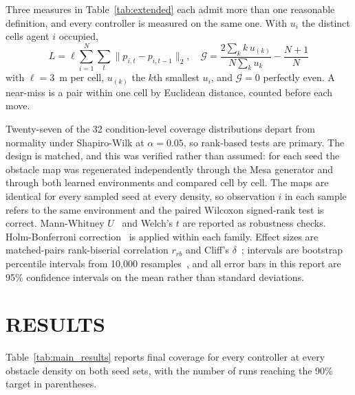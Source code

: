 \documentclass[a4paper, 10pt, conference]{ieeeconf}
\begin{document}
Three measures in Table~\ref{tab:extended} each admit more than one
reasonable definition, and every controller is measured on the same
one. With $u_i$ the distinct cells agent $i$ occupied,
\begin{equation}\label{eq:secondary}
L=\ell\!\!\sum_{i=1}^{N}\sum_{t}\lVert p_{i,t}-p_{i,t-1}\rVert_2,
\quad
\mathcal{G}=\frac{2\sum_{k} k\,u_{(k)}}{N\sum_{k}u_{k}}-\frac{N{+}1}{N}
\end{equation}
with $\ell=3$~m per cell, $u_{(k)}$ the $k$th smallest $u_i$, and
$\mathcal{G}=0$ perfectly even. A near-miss is a pair within one cell
by Euclidean distance, counted before each move.

Twenty-seven of the 32 condition-level coverage distributions depart
from normality under Shapiro-Wilk at $\alpha = 0.05$, so rank-based
tests are primary. The design is matched, and this was verified rather
than assumed: for each seed the obstacle map was regenerated
independently through the Mesa generator and through both learned
environments and compared cell by cell. The maps are identical for
every sampled seed at every density, so observation $i$ in each sample
refers to the same environment and the paired Wilcoxon signed-rank
test is correct. Mann-Whitney $U$~\cite{mann1947} and Welch's $t$ are
reported as robustness checks. Holm-Bonferroni
correction~\cite{holm1979} is applied within each family. Effect sizes
are matched-pairs rank-biserial correlation $r_{rb}$ and Cliff's
$\delta$~\cite{cliff1993}; intervals are bootstrap percentile
intervals from 10{,}000 resamples~\cite{efron1979}, and all error bars
in this report are 95\% confidence intervals on the mean rather than
standard deviations.

\section{RESULTS}\label{sec:results}

Table~\ref{tab:main_results} reports final coverage for every
controller at every obstacle density on both seed sets, with the
number of runs reaching the 90\% target in parentheses.
\end{document}
